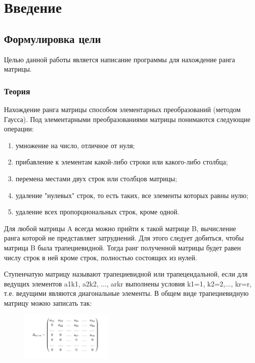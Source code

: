 \documentclass[12pt,a4paper]{scrartcl}
\begin{document}
\section{Введение}
\label{sec:intro}


\subsection{Формулировка цели}
Целью данной работы является написание программы для нахождение ранга матрицы.

\subsubsection{Теория}
Нахождение ранга матрицы способом элементарных преобразований
(методом Гаусса). Под элементарными преобразованиями матрицы понимаются
следующие операции:
    \begin{enumerate}
        \item умножение на число, отличное от нуля;
        \item прибавление к элементам какой-либо строки или какого-либо столбца;
        \item перемена местами двух строк или столбцов матрицы;
        \item удаление "нулевых" строк, то есть таких, все элементы которых равны нулю;
        \item удаление всех пропорциональных строк, кроме одной.
    \end{enumerate}
    \noindent 
Для любой матрицы A всегда можно прийти к такой матрице B,
вычисление ранга которой не представляет затруднений. Для этого следует
добиться, чтобы матрица B была трапециевидной. Тогда ранг полученной
матрицы будет равен числу строк в ней кроме строк, полностью состоящих из
нулей.

Ступенчатую матрицу называют трапециевидной или трапецеидальной,
если для ведущих элементов a1k1, a2k2, ..., arkr выполнены условия k1=1,
k2=2,..., kr=r, т.е. ведущими являются диагональные элементы. В общем виде
трапециевидную матрицу можно записать так:

\label{sec:picexample}
\begin{figure}[h]
	\centering
	\includegraphics[width=0.4\textwidth]{Снимок1.PNG}
\end{figure}
\end{document}
